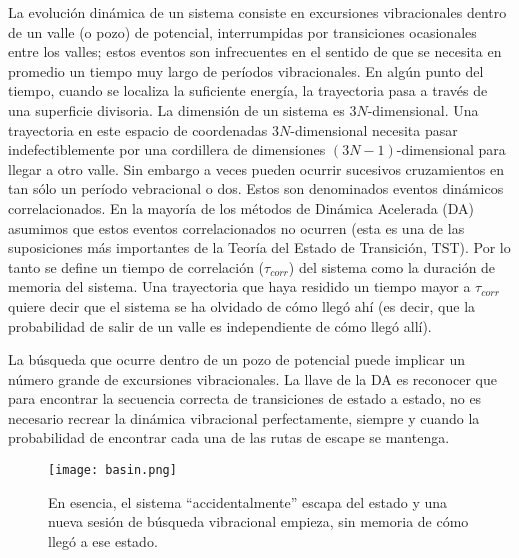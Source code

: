 \documentclass[a4paper,12pt]{article}
\begin{document}
La evolución dinámica de un sistema consiste en excursiones vibracionales
dentro de un valle (o pozo) de potencial, interrumpidas por transiciones ocasionales
entre los valles; estos eventos son infrecuentes en el sentido de que se
necesita en promedio un tiempo muy largo de períodos vibracionales. En algún
punto del tiempo, cuando se localiza la suficiente energía, la trayectoria pasa
a través de una superficie divisoria. La dimensión de un sistema es
$3N$-dimensional. Una trayectoria en este espacio de coordenadas
$3N$-dimensional necesita pasar indefectiblemente por una cordillera de
dimensiones $(3N-1)$-dimensional para llegar a otro valle. Sin embargo a veces
pueden ocurrir sucesivos cruzamientos en tan sólo un período vebracional o
dos. Estos son denominados eventos dinámicos correlacionados. En la mayoría de
los métodos de Dinámica Acelerada (DA) asumimos que estos eventos correlacionados
no ocurren (esta es una de las suposiciones más importantes de la Teoría del
Estado de Transición, TST). Por lo tanto se define un tiempo de correlación
($\tau_{corr}$) del sistema como la duración de memoria del sistema. Una
trayectoria que haya residido un tiempo mayor a $\tau_{corr}$ quiere decir que
el sistema se ha olvidado de cómo llegó ahí (es decir, que la probabilidad de
salir de un valle es independiente de cómo llegó allí).

La búsqueda que ocurre dentro de un pozo de potencial puede implicar un número
grande de excursiones vibracionales. La llave de la DA es reconocer que para
encontrar la secuencia correcta de transiciones de estado a estado, no es
necesario recrear la dinámica vibracional perfectamente, siempre y cuando la
probabilidad de encontrar cada una de las rutas de escape se mantenga.

\begin{SCfigure}
	\centering
	\texttt{[image: basin.png]}
	\caption{En esencia, el sistema ``accidentalmente'' escapa del estado y
	una nueva sesión de búsqueda vibracional empieza, sin memoria de cómo
	llegó a ese estado.}
	\label{fig:basin}
\end{SCfigure}

\end{document}
